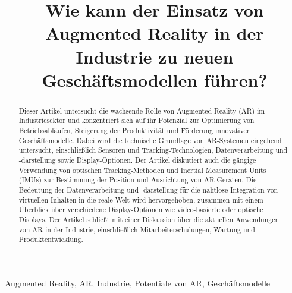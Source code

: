 \documentclass[conference]{IEEEtran}
\title{ Wie kann der Einsatz von Augmented Reality in der Industrie zu neuen Geschäftsmodellen führen?}
\author{
	\IEEEauthorblockN{Simon Kuhn}
	\IEEEauthorblockA{
		\textit{Technische Hochschule Ingolstadt} \\
		16. Juni 2023 %
	}
}
\begin{document}
\maketitle
\begin{abstract}
	Dieser Artikel untersucht die wachsende Rolle von Augmented Reality (AR) im Industriesektor
	und konzentriert sich auf ihr Potenzial zur Optimierung von Betriebsabläufen,
	Steigerung der Produktivität und Förderung innovativer Geschäftsmodelle.
	Dabei wird die technische Grundlage von AR-Systemen eingehend untersucht,
	einschließlich Sensoren und Tracking-Technologien, Datenverarbeitung und
	-darstellung sowie Display-Optionen. Der Artikel diskutiert auch die gängige
	Verwendung von optischen Tracking-Methoden und Inertial Measurement Units (IMUs)
	zur Bestimmung der Position und Ausrichtung von AR-Geräten. Die Bedeutung der
	Datenverarbeitung und -darstellung für die nahtlose Integration von virtuellen
	Inhalten in die reale Welt wird hervorgehoben, zusammen mit einem Überblick über
	verschiedene Display-Optionen wie video-basierte oder optische Displays. Der Artikel
	schließt mit einer Diskussion über die aktuellen Anwendungen von AR in der Industrie,
	einschließlich Mitarbeiterschulungen, Wartung und Produktentwicklung.
\end{abstract}
\begin{IEEEkeywords}
	Augmented Reality, AR, Industrie, Potentiale von AR, Geschäftsmodelle
\end{IEEEkeywords}






\printbibliography
\end{document}
